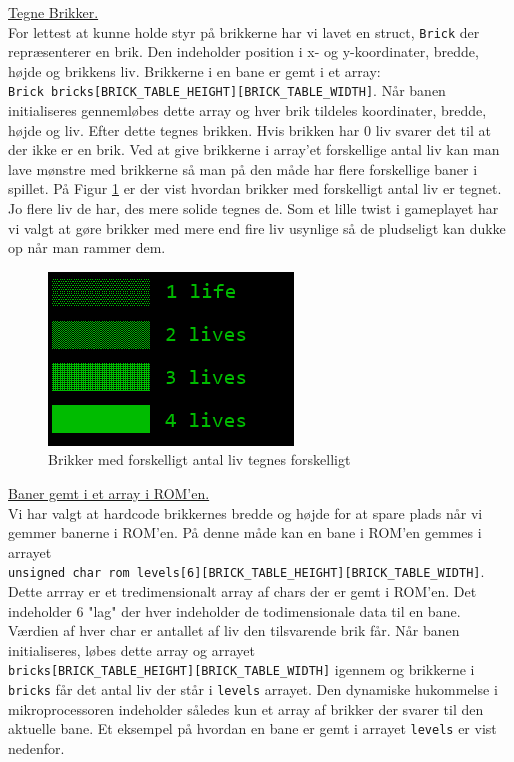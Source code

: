 \underline{Tegne Brikker.}\\

For lettest at kunne holde styr på brikkerne har vi lavet en struct, \texttt{Brick} der repræsenterer en brik. Den indeholder position i x- og y-koordinater, bredde, højde og brikkens liv. Brikkerne i en bane er gemt i et array:\\ \texttt{Brick bricks[BRICK\_TABLE\_HEIGHT][BRICK\_TABLE\_WIDTH]}. Når banen initialiseres gennemløbes dette array og hver brik tildeles koordinater, bredde, højde og liv. Efter dette tegnes brikken. Hvis brikken har 0 liv svarer det til at der ikke er en brik. Ved at give brikkerne i array'et forskellige antal liv kan man lave mønstre med brikkerne så man på den måde har flere forskellige baner i spillet. På Figur \ref{fig:brikker} er der vist hvordan brikker med forskelligt antal liv er tegnet. Jo flere liv de har, des mere solide tegnes de. Som et lille twist i gameplayet har vi valgt at gøre brikker med mere end fire liv usynlige så de pludseligt kan dukke op når man rammer dem. 
\newpage

\begin{figure}[h!]
\centering
\includegraphics[scale=1]{figs/brikker.png}
\caption{Brikker med forskelligt antal liv tegnes forskelligt}
\label{fig:brikker}
\end{figure}


\underline{Baner gemt i et array i ROM'en.}\\

Vi har valgt at hardcode brikkernes bredde og højde for at spare plads når vi gemmer banerne i ROM'en. På denne måde kan en bane i ROM'en gemmes i arrayet\\ \texttt{unsigned char rom levels[6][BRICK\_TABLE\_HEIGHT][BRICK\_TABLE\_WIDTH]}. Dette arrray er et tredimensionalt array af chars der er gemt i ROM'en. Det indeholder 6 "lag" der hver indeholder de todimensionale data til en bane. Værdien af hver char er antallet af liv den tilsvarende brik får. Når banen initialiseres, løbes dette array og arrayet\\ \texttt{bricks[BRICK\_TABLE\_HEIGHT][BRICK\_TABLE\_WIDTH]} igennem og brikkerne i \texttt{bricks} får det antal liv der står i \texttt{levels} arrayet. Den dynamiske hukommelse i mikroprocessoren indeholder således kun et array af brikker der svarer til den aktuelle bane. Et eksempel på hvordan en bane er gemt i arrayet \texttt{levels} er vist nedenfor.

